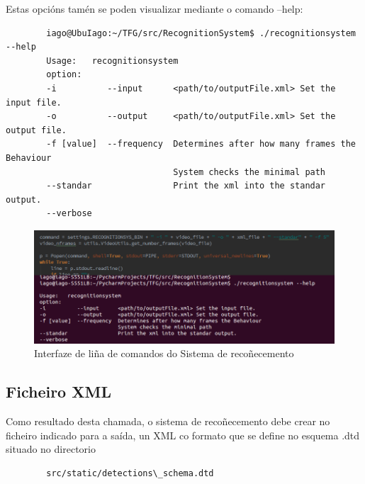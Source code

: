 	Estas opcións tamén se poden visualizar mediante o comando --help:\\ 
	\begin{verbatim}
		iago@UbuIago:~/TFG/src/RecognitionSystem$ ./recognitionsystem --help
		Usage:   recognitionsystem
		option:  
		-i          --input      <path/to/outputFile.xml> Set the input file.
		-o          --output     <path/to/outputFile.xml> Set the output file.
		-f [value]  --frequency  Determines after how many frames the Behaviour 
		                         System checks the minimal path
		--standar                Print the xml into the standar output.
		--verbose
	\end{verbatim}
	
	\begin{figure}[htp]
	\begin{center}
		\includegraphics[scale=0.45]{figures/InterfazLineaComandos.png}
		\caption{Interfaze de liña de comandos do Sistema de recoñecemento}
	\label{fig:InterfazLineaComandos}
	\end{center}
	\end{figure}
	
	\subsection{Ficheiro XML}
		Como resultado desta chamada, o sistema de recoñecemento debe crear no ficheiro indicado 
		para a saída, un XML co formato que se define no esquema .dtd situado no directorio
		
		\begin{verbatim}
		src/static/detections\_schema.dtd
		\end{verbatim}		 

